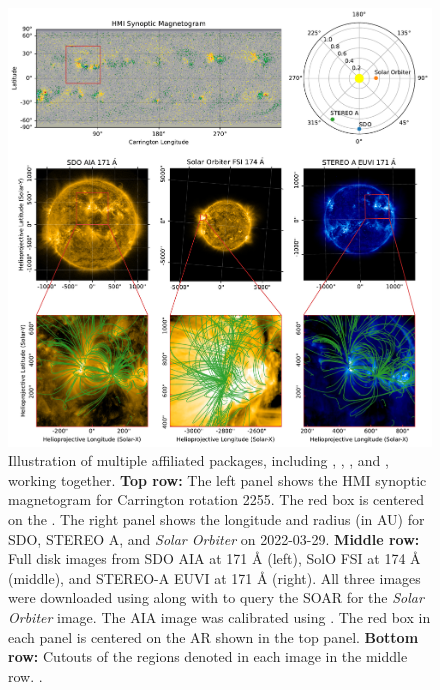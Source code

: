\begin{figure}
    \centering
    \includegraphics[width=\columnwidth]{figures/loops-multi-viewpoint.pdf}
    \caption{
        Illustration of multiple affiliated packages, including \sunpypkg, \soarpkg, \aiapypkg, and \pfsspypkg, working together.
        \textbf{Top row:} The left panel shows the HMI synoptic magnetogram for Carrington rotation 2255. The red box is centered on the \AR{}. The right panel shows the \hgs longitude and radius (in AU) for SDO, STEREO A, and \textit{Solar Orbiter} on 2022-03-29.
        \textbf{Middle row:} Full disk images from SDO AIA at 171 Å (left), SolO FSI at 174 Å (middle), and STEREO-A EUVI at 171 Å (right). All three images were downloaded using \sunpypkg along with \soarpkg to query the SOAR for the \textit{Solar Orbiter} image. The AIA image was calibrated using \aiapypkg.
        The red box in each panel is centered on the AR shown in the top panel.
        \textbf{Bottom row:} Cutouts of the regions denoted in each image in the middle row.
        .
    }
    \label{fig:affiliated-package-showcase}
\end{figure}

